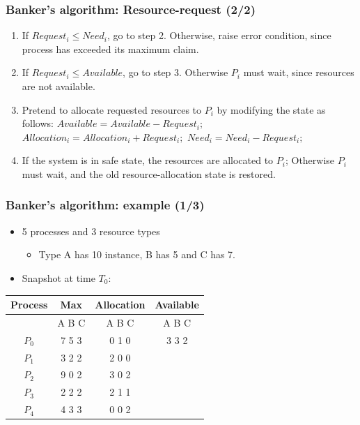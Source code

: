 \documentclass[CJKutf8,xcolor=pdftex,dvipsnames,table]{beamer}
\begin{document}
\begin{CJK*}{UTF8}{song}
  \begin{frame}
  \frametitle{Banker's algorithm: Resource-request (2/2)} \pause
  \begin{enumerate}
  \item{If $Request_i \leq Need_i$, go to step 2. Otherwise, raise error condition, since process has exceeded its maximum claim.} \pause
  \item{If $Request_i \leq Available$, go to step 3.  Otherwise $P_i$ must wait, since resources are not available.} \pause
  \item{Pretend to allocate requested resources to $P_i$ by modifying the state as follows: \newline \pause
      $Available = Available - Request_i;$ \newline \pause
      $Allocation_i = Allocation_i + Request_i;$ \newline \pause
      $Need_i = Need_i - Request_i;$ \newline \pause
    }
  \item{If the system is in safe state, the resources are allocated to $P_i$; \newline \pause
      Otherwise $P_i$ must wait, and the old resource-allocation state is restored.
    }
  \end{enumerate}
  \end{frame}
  
  \begin{frame}
  \frametitle{Banker's algorithm: example (1/3)} \pause
  \begin{itemize}
  \item{5 processes and 3 resource types} \pause
    \begin{itemize}
    \item{Type A has 10 instance, B has 5 and C has 7.} \pause
    \end{itemize}
  \item{Snapshot at time $T_0$:} \pause
  \end{itemize}
  \begin{tabular}{cccc}
    Process & Max   & Allocation & Available\\
    \hline
            & A B C & A B C      & A B C\\
    $P_0$   & 7 5 3 & 0 1 0      & 3 3 2\\
    $P_1$   & 3 2 2 & 2 0 0      &      \\
    $P_2$   & 9 0 2 & 3 0 2      &      \\
    $P_3$   & 2 2 2 & 2 1 1      &      \\
    $P_4$   & 4 3 3 & 0 0 2      &      \\
  \end{tabular}
  \end{frame}
  

\end{CJK*}
\end{document}
